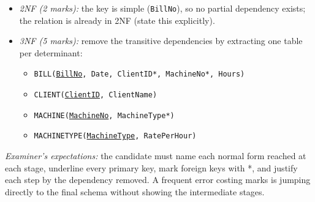 \documentclass[11pt]{article}
\begin{document}
\begin{corrige}
\begin{enumerate}
\begin{itemize}
\item \emph{2NF (2 marks):} the key is simple (\texttt{BillNo}), so no partial dependency exists; the relation is already in 2NF (state this explicitly).
\item \emph{3NF (5 marks):} remove the transitive dependencies by extracting one table per determinant:
\begin{itemize}
\item \texttt{BILL(\underline{BillNo}, Date, ClientID*, MachineNo*, Hours)}
\item \texttt{CLIENT(\underline{ClientID}, ClientName)}
\item \texttt{MACHINE(\underline{MachineNo}, MachineType*)}
\item \texttt{MACHINETYPE(\underline{MachineType}, RatePerHour)}
\end{itemize}
\end{itemize}
\emph{Examiner's expectations:} the candidate must name each normal form reached at each stage, underline every primary key, mark foreign keys with *, and justify each step by the dependency removed. A frequent error costing marks is jumping directly to the final schema without showing the intermediate stages.
\end{enumerate}
\end{corrige}
\end{document}

